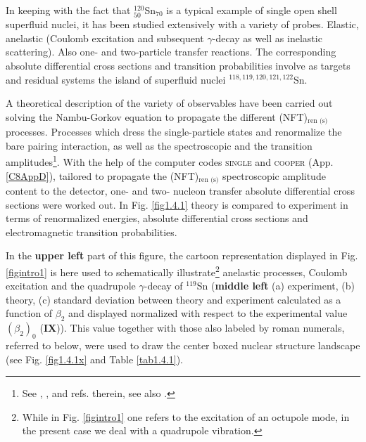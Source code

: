 In keeping with the fact that $^{120}_{50}$Sn$_{70}$ is a 
 typical example of single open shell superfluid nuclei, it has been studied extensively with a variety of probes.  Elastic, anelastic (Coulomb excitation and subsequent $\gamma$-decay as well as inelastic scattering). Also one- and two-particle transfer reactions. The corresponding absolute differential cross sections and transition probabilities  involve as targets and residual systems the island of superfluid nuclei $^{118,119,120,121,122}$Sn.
 
 
  A theoretical description of the variety of observables  have been carried out  solving the Nambu-Gorkov equation to propagate the different  (NFT)$_{\text{ren (s)}}$ processes. Processes which dress the single-particle states and renormalize the bare pairing interaction, as well as the spectroscopic and the transition amplitudes\footnote{See \cite{Idini:13}, \cite{Idini:12}, \cite{Idini:15} and refs. therein, see also \cite{Broglia:16}.}. With the help of the computer codes \textsc{single} and \textsc{cooper} (App.\ref{C8AppD}), tailored to propagate the (NFT)$_{\text{ren (s)}}$ spectroscopic amplitude content to the detector, one- and two- nucleon transfer absolute differential cross sections were worked out. In Fig. \ref{fig1.4.1} theory is compared to experiment in terms of renormalized energies, absolute differential cross sections and electromagnetic transition probabilities. 
  
  
In the \textbf{upper left} part of this figure, the cartoon representation displayed in Fig. \ref{figintro1} is here used to schematically illustrate\footnote{While in Fig. \ref{figintro1} one refers to the excitation of an octupole mode, in the present case we deal with a quadrupole vibration.}  anelastic processes, Coulomb excitation and the quadrupole $\gamma$-decay of $^{119}$Sn (\textbf{middle left} (a) experiment, (b) theory, (c) standard deviation between theory and experiment calculated as a function of $\beta_2$ and displayed normalized with respect to the experimental value $(\beta_2)_0$ (\textbf{IX})). This   value together with those also labeled by roman numerals, referred to below, were used to draw the center boxed nuclear structure landscape (see Fig. \ref{fig1.4.1x} and Table \ref{tab1.4.1}).   
  
